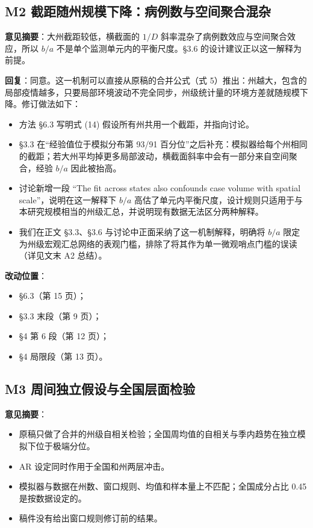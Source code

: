 \documentclass[UTF8,a4paper,11pt,fontset=none]{ctexart}
\providecommand{\tightlist}{\setlength{\itemsep}{1pt}\setlength{\parskip}{0pt}}
\begin{document}
\subsection*{M2 截距随州规模下降：病例数与空间聚合混杂}

\textbf{意见摘要}：大州截距较低，横截面的 \(1/D\) 斜率混杂了病例数效应与空间聚合效应，所以 \(b/a\) 不是单个监测单元内的平衡尺度。§3.6 的设计建议正以这一解释为前提。

\textbf{回复}：同意。这一机制可以直接从原稿的合并公式（式 5）推出：州越大，包含的局部疫情越多，只要局部环境波动不完全同步，州级统计量的环境方差就随规模下降。修订做法如下：

\begin{itemize}
\tightlist
\item
  方法 §6.3 写明式 (14) 假设所有州共用一个截距，并指向讨论。
\item
  §3.3 在``经验值位于模拟分布第 93/91 百分位''之后补充：模拟器给每个州相同的截距；若大州平均掉更多局部波动，横截面斜率中会有一部分来自空间聚合，经验 \(b/a\) 因此被抬高。
\item
  讨论新增一段 ``The fit across states also confounds case volume with spatial scale''，说明在这一解释下 \(b/a\) 高估了单元内平衡尺度，设计规则只适用于与本研究规模相当的州级汇总，并说明现有数据无法区分两种解释。
\item
  我们在正文 §3.3、§3.6 与讨论中正面采纳了这一机制解释，明确将 \(b/a\) 限定为州级宏观汇总网络的表观门槛，排除了将其作为单一微观哨点门槛的误读（详见文末 A2 总结）。
\end{itemize}

\textbf{改动位置}：

\begin{itemize}
\tightlist
\item
  §6.3（第 15 页）；
\item
  §3.3 末段（第 9 页）；
\item
  §4 第 6 段（第 12 页）；
\item
  §4 局限段（第 13 页）。
\end{itemize}

\subsection*{M3 周间独立假设与全国层面检验}

\textbf{意见摘要}：

\begin{itemize}
\tightlist
\item
  原稿只做了合并的州级自相关检验；全国周均值的自相关与季内趋势在独立模拟下位于极端分位。
\item
  AR 设定同时作用于全国和州两层冲击。
\item
  模拟器与数据在州数、窗口规则、均值和样本量上不匹配；全国成分占比 0.45 是按数据设定的。
\item
  稿件没有给出窗口规则修订前的结果。
\end{itemize}
\end{document}
